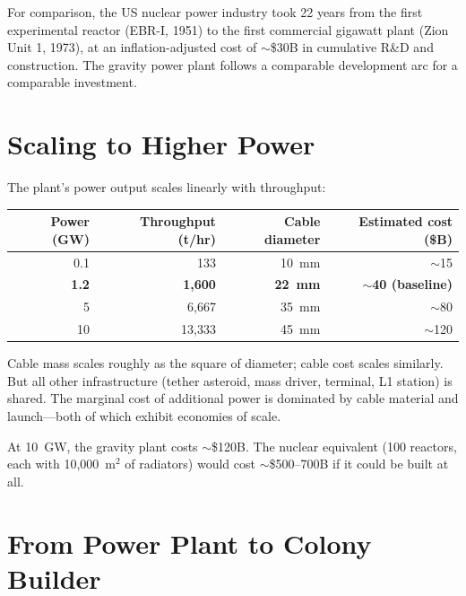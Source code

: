 \documentclass[12pt,letterpaper]{article}
\begin{document}
For comparison, the US nuclear power industry took 22 years from the first experimental reactor (EBR-I, 1951) to the first commercial gigawatt plant (Zion Unit 1, 1973), at an inflation-adjusted cost of $\sim$\$30B in cumulative R\&D and construction. The gravity power plant follows a comparable development arc for a comparable investment.

\section{Scaling to Higher Power}

The plant's power output scales linearly with throughput:

\begin{center}
\small
\begin{tabular}{rrrr}
\toprule
\textbf{Power (GW)} & \textbf{Throughput (t/hr)} & \textbf{Cable diameter} & \textbf{Estimated cost (\$B)} \\
\midrule
0.1 & 133 & 10~mm & $\sim$15 \\
\textbf{1.2} & \textbf{1,600} & \textbf{22~mm} & $\sim$\textbf{40 (baseline)} \\
5 & 6,667 & 35~mm & $\sim$80 \\
10 & 13,333 & 45~mm & $\sim$120 \\
\bottomrule
\end{tabular}
\end{center}

Cable mass scales roughly as the square of diameter; cable cost scales similarly. But all other infrastructure (tether asteroid, mass driver, terminal, L1 station) is shared. The marginal cost of additional power is dominated by cable material and launch---both of which exhibit economies of scale.

At 10~GW, the gravity plant costs $\sim$\$120B. The nuclear equivalent (100 reactors, each with 10,000~m$^2$ of radiators) would cost $\sim$\$500--700B if it could be built at all.

\section{From Power Plant to Colony Builder}
\end{document}
